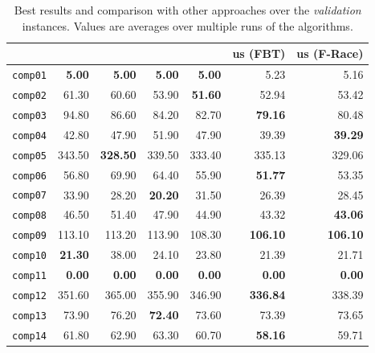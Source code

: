 \documentclass[authoryear,12pt]{article}
\begin{document}
{

    \begin{table}[htdp]
    \caption{Best results and comparison with other approaches over the \emph{validation} instances. Values are averages over multiple runs of the algorithms.}
    \begin{scriptsize}
    \begin{center}

    \begin{tabular}{l|*{4}{r}|r|r}
\toprule
                    & \citeauthor{Mull09}   &  \citeauthor{LuHa09}     &  \citeauthor{ATMM10}  &  \citeauthor{BeDS12}    & us (FBT)       & us (F-Race)  \\  %
\midrule
\texttt{comp01}  & \textbf{5.00} & \textbf{5.00} & \textbf{5.00} & \textbf{5.00} & 5.23 & 5.16 \\
\texttt{comp02}  & 61.30 & 60.60 & 53.90 & \textbf{51.60} & 52.94 & 53.42 \\
\texttt{comp03}  & 94.80 & 86.60 & 84.20 & 82.70 & \textbf{79.16} & 80.48 \\
\texttt{comp04}  & 42.80 & 47.90 & 51.90 & 47.90 & 39.39 & \textbf{39.29} \\
\texttt{comp05}  & 343.50 & \textbf{328.50} & 339.50 & 333.40 & 335.13 & 329.06 \\
\texttt{comp06}  & 56.80 & 69.90 & 64.40 & 55.90 & \textbf{51.77} & 53.35 \\
\texttt{comp07}  & 33.90 & 28.20 & \textbf{20.20} & 31.50 & 26.39 & 28.45 \\
\texttt{comp08}  & 46.50 & 51.40 & 47.90 & 44.90 & 43.32 & \textbf{43.06} \\
\texttt{comp09}  & 113.10 & 113.20 & 113.90 & 108.30 & \textbf{106.10} & \textbf{106.10} \\
\texttt{comp10}  & \textbf{21.30} & 38.00 & 24.10 & 23.80 & 21.39 & 21.71 \\
\texttt{comp11}  & \textbf{0.00} & \textbf{0.00} & \textbf{0.00} & \textbf{0.00} & \textbf{0.00} & \textbf{0.00} \\
\texttt{comp12}  & 351.60 & 365.00 & 355.90 & 346.90 & \textbf{336.84} & 338.39 \\
\texttt{comp13}  & 73.90 & 76.20 & \textbf{72.40} & 73.60 & 73.39 & 73.65 \\
\texttt{comp14}  & 61.80 & 62.90 & 63.30 & 60.70 & \textbf{58.16} & 59.71 \\

\end{tabular}
\end{center}
\end{scriptsize}
\end{table}}
\end{document}
